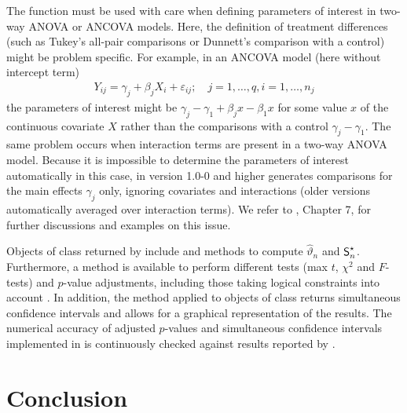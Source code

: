 \documentclass[bimj,fleqn]{w-art}
\begin{document}
The  function must be used with care when defining parameters 
of interest in two-way ANOVA or ANCOVA models. Here, the definition
of treatment differences (such as Tukey's all-pair comparisons or Dunnett's
comparison with a control) 
might be problem specific. For example, in an ANCOVA model (here without
intercept term)
\begin{eqnarray*}
Y_{ij} = \gamma_j + \beta_j X_i + \varepsilon_{ij}; \quad j = 1, \dots, q, i
= 1, \dots, n_j
\end{eqnarray*}
the parameters of interest might be $\gamma_j - \gamma_1 + \beta_j x -
\beta_1 x$ for some value $x$ of the continuous covariate $X$ rather
than the comparisons with a control $\gamma_j - \gamma_1$. The same
problem occurs when interaction terms are present in a two-way ANOVA model.
Because it is impossible to determine the parameters of interest
automatically in this case,  in  
version 1.0-0 and higher generates comparisons for the main effects
$\gamma_j$ only, ignoring covariates and interactions (older versions
automatically averaged over interaction terms). We refer to
\cite{Hsu1996}, Chapter 7, for further discussions and examples on this
issue.

Objects of class  returned by  include %
 and  methods to compute $\hat{\vartheta}_n$ and $%
\SK$. Furthermore, a  method is available to perform
different tests (max $t$, $\chi^2$ and $F$-tests) and $p$-value adjustments,
including those taking logical constraints into account \citep{Shaffer1986,
Westfall1997}. In addition, the  method applied to objects
of class  returns simultaneous confidence intervals and allows
for a graphical representation of the results. The numerical accuracy of
adjusted $p$-values and simultaneous confidence intervals implemented in %
 is continuously checked against results reported by \cite%
{Westfall1999}.





\section{Conclusion}
\end{document}
